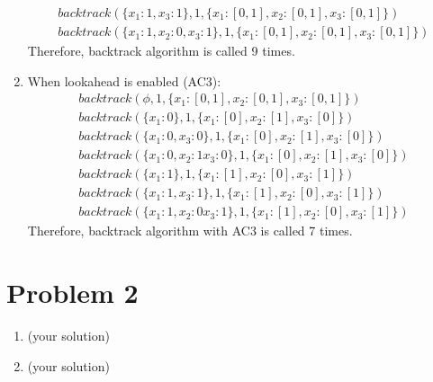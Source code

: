 \documentclass[12pt]{article}
\begin{document}
\begin{enumerate}[label=(\alph*)]
\begin{align*}
  backtrack(\{x_1: 1, x_3: 1\}, 1, \{x_1: [0, 1], x_2: [0, 1], x_3: [0,1]\}) \\
  backtrack(\{x_1: 1, x_2: 0, x_3: 1\}, 1, \{x_1: [0, 1], x_2: [0, 1], x_3: [0,1]\})
  \end{align*}
  Therefore, backtrack algorithm is called 9 times.
  \item When lookahead is enabled (AC3):
  \begin{align*}
  backtrack(\phi, 1, \{x_1: [0, 1], x_2: [0, 1], x_3: [0,1]\}) \\
  backtrack(\{x_1: 0\}, 1, \{x_1: [0], x_2: [1], x_3: [0]\}) \\
  backtrack(\{x_1: 0, x_3: 0\}, 1, \{x_1: [0], x_2: [1], x_3: [0]\}) \\
  backtrack(\{x_1: 0, x_2: 1 x_3: 0\}, 1, \{x_1: [0], x_2: [1], x_3: [0]\}) \\
  backtrack(\{x_1: 1\}, 1, \{x_1: [1], x_2: [0], x_3: [1]\}) \\
  backtrack(\{x_1: 1, x_3: 1\}, 1, \{x_1: [1], x_2: [0], x_3: [1]\}) \\
  backtrack(\{x_1: 1, x_2: 0 x_3: 1\}, 1, \{x_1: [1], x_2: [0], x_3: [1]\})
  \end{align*}
  Therefore, backtrack algorithm with AC3 is called 7 times.
\end{enumerate}
\section*{Problem 2}

\begin{enumerate}[label=(\alph*)]
  \item (your solution)
  \item (your solution)
\end{enumerate}
\end{document}
